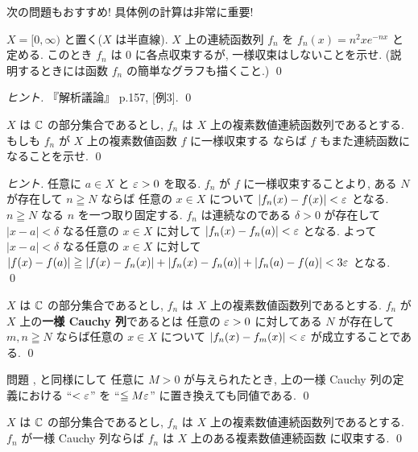 \documentclass[12pt,twoside]{jarticle}
\begin{document}
{\large 次の問題もおすすめ! 具体例の計算は非常に重要!}

\begin{question}[一様収束しない函数列の例]
 $X=[0,\infty)$ と置く($X$ は半直線).
 $X$ 上の連続函数列 $f_n$ を $f_n(x)=n^2xe^{-nx}$ と定める.
 このとき $f_n$ は $0$ に各点収束するが, 一様収束はしないことを示せ.
 (説明するときには函数 $f_n$ の簡単なグラフも描くこと.)
 \qed
\end{question}

\begin{proof}[ヒント]
 『解析議論』\cite{takagi} p.157, [例3].
 \qed
\end{proof}

\begin{question}[連続函数の全体が一様収束で閉じていること]
 $X$ は ${\mathbb C}$ の部分集合であるとし, 
 $f_n$ は $X$ 上の複素数値連続函数列であるとする.
 もしも $f_n$ が $X$ 上の複素数値函数 $f$ に一様収束する
 ならば $f$ もまた連続函数になることを示せ.
 \qed
\end{question}

\begin{proof}[ヒント]
 任意に $a\in X$ と $\varepsilon>0$ を取る.
 $f_n$ が $f$ に一様収束することより, 
 ある $N$ が存在して $n\geqq N$ ならば
 任意の $x\in X$ について $|f_n(x)-f(x)|<\varepsilon$ となる.
 $n\geqq N$ なる $n$ を一つ取り固定する.
 $f_n$ は連続なのである $\delta>0$ が存在して %
 $|x-a|<\delta$ なる任意の $x\in X$ に対して $|f_n(x)-f_n(a)|<\varepsilon$ となる. 
 よって  $|x-a|<\delta$ なる任意の $x\in X$ に対して %
 $|f(x)-f(a)|\geqq|f(x)-f_n(x)|+|f_n(x)-f_n(a)|+|f_n(a)-f(a)|<3\varepsilon$ となる.
 \qed
\end{proof}

\begin{definition}
 $X$ は ${\mathbb C}$ の部分集合であるとし,
 $f_n$ は $X$ 上の複素数値函数列であるとする.
 $f_n$ が $X$ 上の{\bf 一様 Cauchy 列}であるとは
 任意の $\varepsilon>0$ に対してある $N$ が存在して
 $m,n\geqq N$ ならば任意の $x\in X$ について $|f_n(x)-f_m(x)|<\varepsilon$
 が成立することである.
 \qed
\end{definition}

\begin{rem}
 問題 ,  と同様にして
 任意に $M>0$ が与えられたとき, 
 上の一様 Cauchy 列の定義における ``$<\varepsilon$'' を ``$\leqq M\varepsilon$''
 に置き換えても同値である.
 \qed
\end{rem}

\begin{question}[連続函数列の一様収束に関する完備性]
 $X$ は ${\mathbb C}$ の部分集合であるとし,
 $f_n$ は $X$ 上の複素数値連続函数列であるとする.
 $f_n$ が一様 Cauchy 列ならば $f_n$ は $X$ 上のある複素数値連続函数
 に収束する.
 \qed
\end{question}
\end{document}
